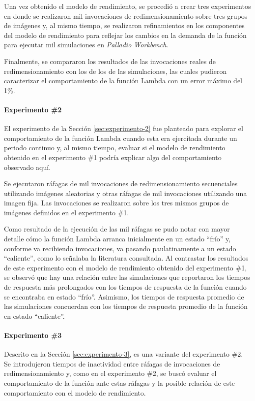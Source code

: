 Una vez obtenido el modelo de rendimiento, se procedió a crear tres experimentos en donde se realizaron mil invocaciones de redimensionamiento sobre tres grupos de imágenes y, al mismo tiempo, se realizaron refinamientos en los componentes del modelo de rendimiento para reflejar los cambios en la demanda de la función para ejecutar mil simulaciones en \emph{Palladio Workbench}.

Finalmente, se compararon los resultados de las invocaciones reales de redimensionamiento con los de los de las simulaciones, las cuales pudieron caracterizar el comportamiento de la función Lambda con un error máximo del 1\%.

\paragraph{Experimento \#2} El experimento de la Sección \ref{sec:experimento-2} fue planteado para explorar el comportamiento de la función Lambda cuando esta era ejercitada durante un periodo continuo y, al mismo tiempo, evaluar si el modelo de rendimiento obtenido en el experimento \#1 podría explicar algo del comportamiento observado aquí.

Se ejecutaron ráfagas de mil invocaciones de redimensionamiento secuenciales utilizando imágenes aleatorias y otras ráfagas de mil invocaciones utilizando una imagen fija. Las invocaciones se realizaron sobre los tres mismos grupos de imágenes definidos en el experimento \#1.

Como resultado de la ejecución de las mil ráfagas se pudo notar con mayor detalle cómo la función Lambda arranca inicialmente en un estado ``frío'' y, conforme va recibiendo invocaciones, va pasando paulatinamente a un estado ``caliente'', como lo señalaba la literatura consultada. Al contrastar los resultados de este experimento con el modelo de rendimiento obtenido del experimento \#1, se observó que hay una relación entre las simulaciones que reportaron los tiempos de respuesta más prolongados con los tiempos de respuesta de la función cuando se encontraba en estado ``frío''. Asimismo, los tiempos de respuesta promedio de las simulaciones concuerdan con los tiempos de respuesta promedio de la función en estado ``caliente''.

\paragraph{Experimento \#3} Descrito en la Sección \ref{sec:experimento-3}, es una variante del experimento \#2. Se introdujeron tiempos de inactividad entre ráfagas de invocaciones de redimensionamiento y, como en el experimento \#2, se buscó evaluar el comportamiento de la función ante estas ráfagas y la posible relación de este comportamiento con el modelo de rendimiento.

